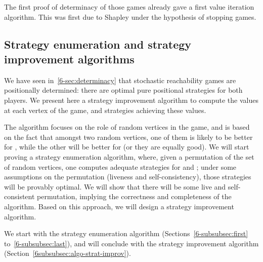 The first proof of determinacy of those games already gave a first
value iteration algorithm. This was first due to Shapley under the
hypothesis of stopping games.



\subsection{Strategy enumeration and strategy improvement algorithms}

%


We have seen in~\cref{6-sec:determinacy} that stochastic
reachability games are positionally determined: there are optimal
 pure positional strategies for both players. We present here a
strategy improvement algorithm to compute the values at each vertex of
the game, and strategies achieving these values.

The algorithm focuses on the role of random vertices in the game, and
is based on the fact that amongst two random vertices, one of them is
likely to be better for \Eve, while the other will be better for \Adam
(or they are equally good). We will start proving a strategy
enumeration algorithm, where, given a permutation of the set of random
vertices, one computes adequate strategies for \Eve and \Adam; under
some assumptions on the permutation (liveness and self-consistency),
those strategies will be provably optimal. We will show that there
will be some live and self-consistent permutation, implying the
correctness and completeness of the algorithm. Based on this approach,
we will design a strategy improvement algorithm.

We start with the strategy enumeration algorithm
(Sections~\ref{6-subsubsec:first} to~\ref{6-subsubsec:last}), and will
conclude with the strategy improvement algorithm
(Section~\ref{6subsubsec:algo-strat-improv}).



